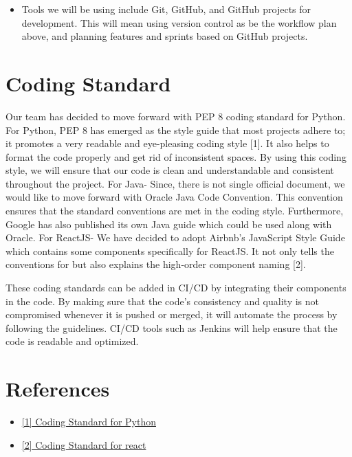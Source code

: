\documentclass{article}
\begin{document}
\begin{itemize}
  \item Tools we will be using include Git, GitHub, and GitHub projects for development. This will mean using version control as be the workflow plan above, and planning features and sprints based on GitHub projects. 
\end{itemize}

\section{Coding Standard}

Our team has decided to move forward with PEP 8 coding standard for Python. For Python, PEP 8 has emerged as the style guide that most projects adhere to; it promotes a very readable and eye-pleasing coding style [1]. It also helps to format the code properly and get rid of inconsistent spaces. By using this coding style, we will ensure that our code is clean and understandable and consistent throughout the project.
For Java- Since, there is not single official document, we would like to move forward with Oracle Java Code Convention. This convention ensures that the standard conventions are met in the coding style. Furthermore, Google has also published its own Java guide which could be used along with Oracle.
For ReactJS- We have decided to adopt Airbnb's JavaScript Style Guide which contains some components specifically for ReactJS. It not only tells the conventions for but also explains the high-order component naming [2].

These coding standards can be added in CI/CD by integrating their components in the code. By making sure that the code's consistency and quality is not compromised whenever it is pushed or merged, it will automate the process by following the guidelines.
CI/CD tools such as Jenkins will help ensure that the code is readable and optimized. 

\section{References}
\begin{itemize}
  \item
  \href{https://www.geeksforgeeks.org/pep-8-coding-style-guide-python/}{[1] Coding Standard for Python}
  \item
  \href{https://airbnb.io/javascript/react/} {[2] Coding Standard for react}
\end {itemize}

\newpage{}
\end{document}

